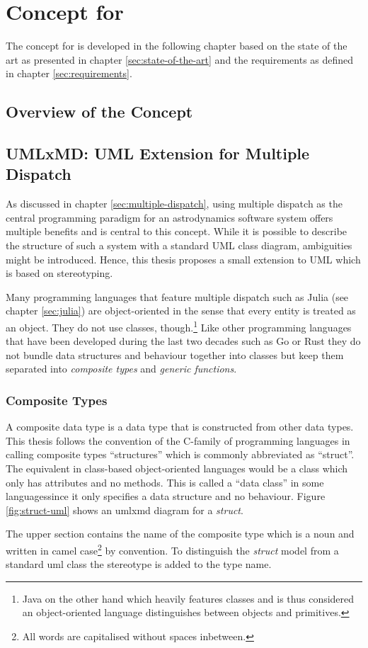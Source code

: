 \chapter{Concept for \topic}
\label{sec:concept}

The concept for \topic is developed in the following chapter based on the state of the art as presented in chapter \ref{sec:state-of-the-art} and the requirements as defined in chapter \ref{sec:requirements}.

\section{Overview of the Concept}
\label{sec:overview-concept}

\section{UMLxMD: UML Extension for Multiple Dispatch}
\label{sec:umlxmd}
As discussed in chapter \ref{sec:multiple-dispatch}, using multiple dispatch as the central programming paradigm for an astrodynamics software system offers multiple benefits and is central to this concept.
While it is possible to describe the structure of such a system with a standard UML class diagram, ambiguities might be introduced.
Hence, this thesis proposes a small extension to UML which is based on stereotyping.

Many programming languages that feature multiple dispatch such as Julia (see chapter \ref{sec:julia}) are object-oriented in the sense that every entity is treated as an object.
They do not use classes, though.\footnote{Java on the other hand which heavily features classes and is thus considered an object-oriented language distinguishes between objects and primitives.}
Like other programming languages that have been developed during the last two decades such as Go or Rust they do not bundle data structures and behaviour together into classes but keep them separated into \emph{composite types} and \emph{generic functions}.
\subsection{Composite Types}
\label{sec:composite-types}
A composite data type is a data type that is constructed from other data types.\ct
This thesis follows the convention of the C-family of programming languages in calling composite types \enquote{structures} which is commonly abbreviated as \enquote{struct}.\ct
The equivalent in class-based object-oriented languages would be a class which only has attributes and no methods.
This is called a \enquote{data class} in some languages\ct since it only specifies a data structure and no behaviour.
Figure \ref{fig:struct-uml} shows an \ac{umlxmd} diagram for a \emph{struct}.

The upper section contains the name of the composite type which is a noun and written in camel case\footnote{All words are capitalised without spaces inbetween.} by convention.
To distinguish the \emph{struct} model from a standard \ac{uml} class the  stereotype is added to the type name.

